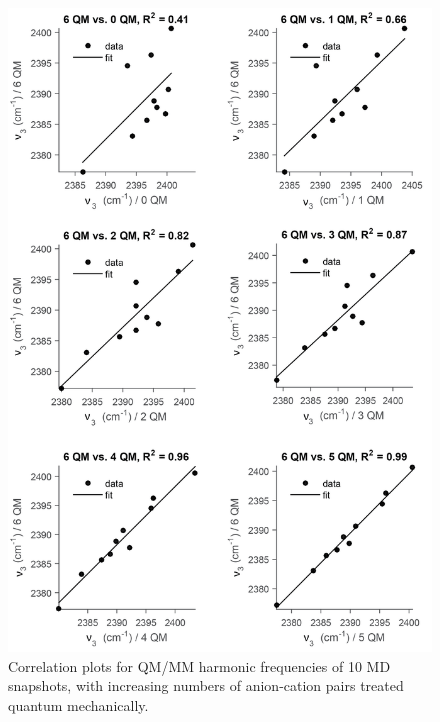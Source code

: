 \documentclass[%
  class = book,%
  crop = false,%
  float = true,%
  multi = true,%
  preview = false,%
]{standalone}
\begin{document}
\begin{figure}
  \centering
  \includegraphics[scale=0.85]{figureS5.png}%
  \caption[Self-correlation of QM/MM frequencies with increasing QM region size]{Correlation plots for QM/MM harmonic frequencies of \num{10} MD snapshots, with increasing numbers of anion-cation pairs treated quantum mechanically.}
  \label{paper_02:fig:S5}
\end{figure}

\onlyifstandalone{\printbibliography}
\end{document}
